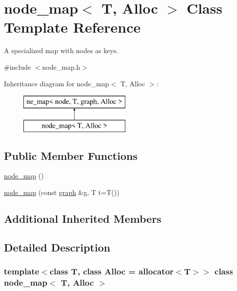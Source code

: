 \hypertarget{classnode__map}{}\section{node\+\_\+map$<$ T, Alloc $>$ Class Template Reference}
\label{classnode__map}


A specialized map with nodes as keys.  




{\ttfamily \#include $<$node\+\_\+map.\+h$>$}

Inheritance diagram for node\+\_\+map$<$ T, Alloc $>$\+:\begin{figure}[H]
\begin{center}
\leavevmode
\includegraphics[height=2.000000cm]{classnode__map}
\end{center}
\end{figure}
\subsection*{Public Member Functions}
\begin{DoxyCompactItemize}
\item 
\mbox{\hyperlink{classnode__map_a7a4c767f07f348d31a1004776485d17b}{node\+\_\+map}} ()
\item 
\mbox{\hyperlink{classnode__map_a5bd24349e3a56379592889abbe4c6b09}{node\+\_\+map}} (const \mbox{\hyperlink{classgraph}{graph}} \&g, T t=T())
\end{DoxyCompactItemize}
\subsection*{Additional Inherited Members}


\subsection{Detailed Description}
\subsubsection*{template$<$class T, class Alloc = allocator$<$\+T$>$$>$\newline
class node\+\_\+map$<$ T, Alloc $>$}

